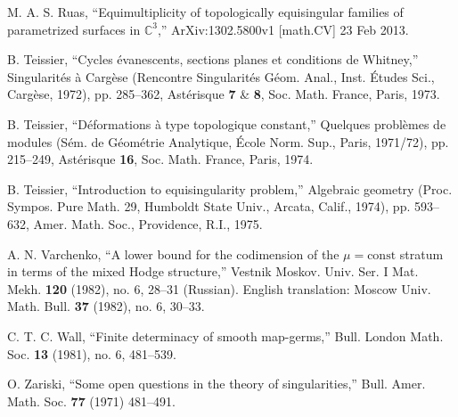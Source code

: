 \documentclass[a4paper,fleqn,11pt]{amsart}
\theoremstyle{definition}
\theoremstyle{remark}
\numberwithin{equation}{section}
\begin{document}
\begin{thebibliography}{10}
 M. A. S. Ruas, ``Equimultiplicity of topologically equisingular families of parametrized surfaces in $\mathbb{C}^3$,'' ArXiv:1302.5800v1 [math.CV] 23 Feb 2013.

 B. Teissier, ``Cycles \'evanescents, sections planes et conditions de Whitney,'' Singularit\'es \`a Carg\`ese (Rencontre Singularit\'es G\'eom. Anal., Inst. \'Etudes Sci., Carg\`ese, 1972), pp. 285--362, Ast\'erisque
\textbf{7} \& \textbf{8}, Soc. Math. France, Paris, 1973.

 B. Teissier, ``D\'eformations \`a type topologique constant,'' Quelques probl\`emes de modules (S\'em. de G\'eom\'etrie Analytique, \'Ecole Norm. Sup., Paris, 1971/72), pp. 215--249, Ast\'erisque \textbf{16}, Soc. Math. France, Paris, 1974.

 B. Teissier, ``Introduction to equisingularity problem,'' Algebraic geometry (Proc. Sympos. Pure Math. 29, Humboldt State Univ., Arcata, Calif., 1974), pp. 593--632, Amer. Math. Soc., Providence, R.I., 1975.

 A. N. Varchenko, ``A lower bound for the codimension of the $\mu=\mbox{const}$ stratum in terms of the mixed Hodge structure,'' Vestnik Moskov. Univ. Ser. I Mat. Mekh. \textbf{120} (1982), no. 6, 28--31 (Russian). English translation: Moscow Univ. Math. Bull. \textbf{37} (1982), no. 6, 30--33.

 C. T. C. Wall, ``Finite determinacy of smooth map-germs,'' Bull. London Math. Soc. \textbf{13}  (1981), no. 6, 481--539.

 O. Zariski, ``Some open questions in the theory of
singularities,'' Bull. Amer. Math. Soc. \textbf{77} (1971) 481--491.

\end{thebibliography}
\end{document}
